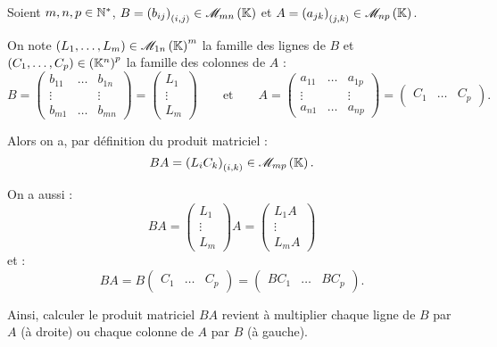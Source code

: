 \begin{rem}
Soient \(m,n,p\in\mathbb{N}^*\), \(B=\paren{b_{ij}}_{\paren{i,j}}\in\M{mn}\) et \(A=\paren{a_{jk}}_{\paren{j,k}}\in\M{np}\).

On note \(\paren{L_1,\dots,L_m}\in\M{1n}^m\) la famille des lignes de \(B\) et \(\left(C_1,\dots,C_p\right)\in\left(\mathbb{K}^n\right)^p\) la famille des colonnes de \(A\) : \[B=\begin{pmatrix}
b_{11} & \dots & b_{1n} \\
\vdots &  & \vdots \\
b_{m1} & \dots & b_{mn}
\end{pmatrix}=\begin{pmatrix}
L_1 \\
\vdots \\
L_m
\end{pmatrix}\qquad\text{et}\qquad A=\begin{pmatrix}
a_{11} & \dots & a_{1p} \\
\vdots &  & \vdots \\
a_{n1} & \dots & a_{np}
\end{pmatrix}=\begin{pmatrix}
C_1 & \dots & C_p
\end{pmatrix}.\]

Alors on a, par définition du produit matriciel : \[BA=\paren{L_iC_k}_{\paren{i,k}}\in\M{mp}.\]

On a aussi : \[BA=\begin{pmatrix}
L_1 \\
\vdots \\
L_m
\end{pmatrix}A=\begin{pmatrix}
L_1A \\
\vdots \\
L_mA
\end{pmatrix}\] et : \[BA=B\begin{pmatrix}
C_1 & \dots & C_p
\end{pmatrix}=\begin{pmatrix}
BC_1 & \dots & BC_p
\end{pmatrix}.\]

Ainsi, calculer le produit matriciel \(BA\) revient à multiplier chaque ligne de \(B\) par \(A\) (à droite) ou chaque colonne de \(A\) par \(B\) (à gauche).
\end{rem}

